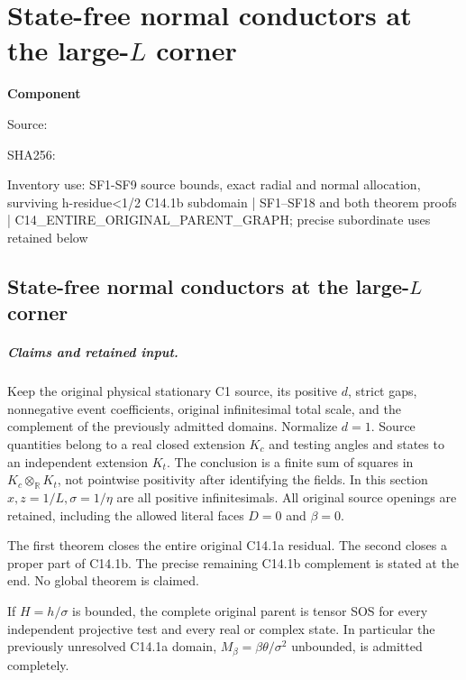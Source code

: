 \chapter{State-free normal conductors at the large-$L$ corner}
\label{component:p3be5a8005801}
\noindent\textbf{Component }\par
{\small\noindent Source: \par}
{\small\noindent SHA256: \par}
{\small\noindent Inventory use: SF1-SF9 source bounds, exact radial and normal allocation, surviving h-residue<1/2 C14.1b subdomain | SF1--SF18 and both theorem proofs | C14\_\allowbreak{}ENTIRE\_\allowbreak{}ORIGINAL\_\allowbreak{}PARENT\_\allowbreak{}GRAPH; precise subordinate uses retained below\par}
\medskip
\section{State-free normal conductors at the large-$L$ corner}
\label{p3be5a8005801:sec:c141-state-free}

\paragraph{Claims and retained input.}
Keep the original physical stationary C1 source, its positive $d$,
strict gaps, nonnegative event coefficients, original infinitesimal
total scale, and the complement of the previously admitted domains.
Normalize $d=1$. Source quantities belong to a real closed extension
$K_c$ and testing angles and states to an independent extension $K_t$.
The conclusion is a finite sum of squares in
$K_c\otimes_{\mathbb R}K_t$, not pointwise positivity after identifying
the fields. In this section $x,z=1/L,\sigma=1/\eta$ are all positive
infinitesimals. All original source openings are retained, including
the allowed literal faces $D=0$ and $\beta=0$.

The first theorem closes the entire original C14.1a residual. The
second closes a proper part of C14.1b. The precise remaining C14.1b
complement is stated at the end. No global theorem is claimed.

\begin{theorem}[C14.1a]
If $H=h/\sigma$ is bounded, the complete original parent is tensor
SOS for every independent projective test and every real or complex
state. In particular the previously unresolved C14.1a domain,
$M_\beta=\beta\theta/\sigma^2$ unbounded, is admitted completely.
\end{theorem}

